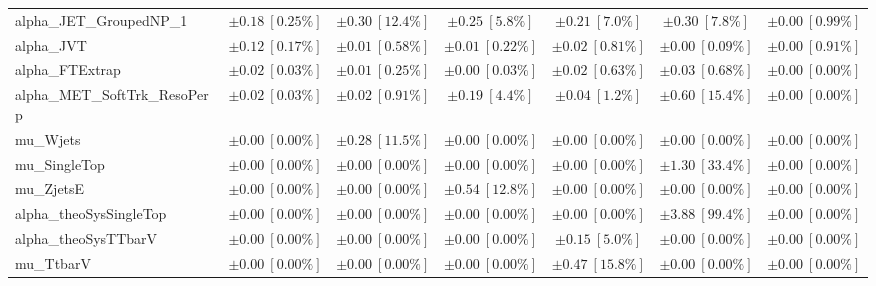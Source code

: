 \begin{sidewaystable}
\begin{center}
\begin{tabular*}{\textwidth}{@{\extracolsep{\fill}}lcccccc}
alpha\_JET\_GroupedNP\_1         & $\pm 0.18\ [0.25\%] $          & $\pm 0.30\ [12.4\%] $          & $\pm 0.25\ [5.8\%] $          & $\pm 0.21\ [7.0\%] $          & $\pm 0.30\ [7.8\%] $          & $\pm 0.00\ [0.99\%] $       \\
alpha\_JVT         & $\pm 0.12\ [0.17\%] $          & $\pm 0.01\ [0.58\%] $          & $\pm 0.01\ [0.22\%] $          & $\pm 0.02\ [0.81\%] $          & $\pm 0.00\ [0.09\%] $          & $\pm 0.00\ [0.91\%] $       \\
alpha\_FTExtrap         & $\pm 0.02\ [0.03\%] $          & $\pm 0.01\ [0.25\%] $          & $\pm 0.00\ [0.03\%] $          & $\pm 0.02\ [0.63\%] $          & $\pm 0.03\ [0.68\%] $          & $\pm 0.00\ [0.00\%] $       \\
alpha\_MET\_SoftTrk\_ResoPerp         & $\pm 0.02\ [0.03\%] $          & $\pm 0.02\ [0.91\%] $          & $\pm 0.19\ [4.4\%] $          & $\pm 0.04\ [1.2\%] $          & $\pm 0.60\ [15.4\%] $          & $\pm 0.00\ [0.00\%] $       \\
mu\_Wjets         & $\pm 0.00\ [0.00\%] $          & $\pm 0.28\ [11.5\%] $          & $\pm 0.00\ [0.00\%] $          & $\pm 0.00\ [0.00\%] $          & $\pm 0.00\ [0.00\%] $          & $\pm 0.00\ [0.00\%] $       \\
mu\_SingleTop         & $\pm 0.00\ [0.00\%] $          & $\pm 0.00\ [0.00\%] $          & $\pm 0.00\ [0.00\%] $          & $\pm 0.00\ [0.00\%] $          & $\pm 1.30\ [33.4\%] $          & $\pm 0.00\ [0.00\%] $       \\
mu\_ZjetsE         & $\pm 0.00\ [0.00\%] $          & $\pm 0.00\ [0.00\%] $          & $\pm 0.54\ [12.8\%] $          & $\pm 0.00\ [0.00\%] $          & $\pm 0.00\ [0.00\%] $          & $\pm 0.00\ [0.00\%] $       \\
alpha\_theoSysSingleTop         & $\pm 0.00\ [0.00\%] $          & $\pm 0.00\ [0.00\%] $          & $\pm 0.00\ [0.00\%] $          & $\pm 0.00\ [0.00\%] $          & $\pm 3.88\ [99.4\%] $          & $\pm 0.00\ [0.00\%] $       \\
alpha\_theoSysTTbarV         & $\pm 0.00\ [0.00\%] $          & $\pm 0.00\ [0.00\%] $          & $\pm 0.00\ [0.00\%] $          & $\pm 0.15\ [5.0\%] $          & $\pm 0.00\ [0.00\%] $          & $\pm 0.00\ [0.00\%] $       \\
mu\_TtbarV         & $\pm 0.00\ [0.00\%] $          & $\pm 0.00\ [0.00\%] $          & $\pm 0.00\ [0.00\%] $          & $\pm 0.47\ [15.8\%] $          & $\pm 0.00\ [0.00\%] $          & $\pm 0.00\ [0.00\%] $       \\

\end{tabular*}
\end{center}
\end{sidewaystable}
